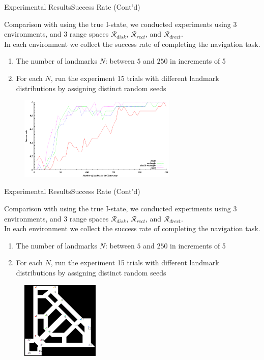 \documentclass[10pt]{beamer}
\begin{document}
\begin{frame}{Experimental Results}{Success Rate (Cont'd)}
 \small{Comparison with using the true I-state, we conducted experiments using 3
 environments, and 3 range spaces $\mathcal{R}_{disk}$, $\mathcal{R}_{rect}$,
 and  $\mathcal{R}_{drect}$. \\
 In each environment we collect the success rate of completing the navigation
 task. 
 \begin{enumerate}
 \item The number of landmarks $N$: between $5$ and $250$ in increments of 5
 \item For each $N$, run the experiment 15 trials with different landmark
   distributions by assigning distinct random seeds
 \end{enumerate}
}
\begin{figure}
  \centering
  \includegraphics[width=0.67\textwidth]{Data/expnumclutter}
\end{figure}
\end{frame}

\begin{frame}{Experimental Results}{Success Rate (Cont'd)}
 \small{Comparison with using the true I-state, we conducted experiments using 3
 environments, and 3 range spaces $\mathcal{R}_{disk}$, $\mathcal{R}_{rect}$,
 and  $\mathcal{R}_{drect}$. \\
 In each environment we collect the success rate of completing the navigation
 task. 
 \begin{enumerate}
 \item The number of landmarks $N$: between $5$ and $250$ in increments of 5
 \item For each $N$, run the experiment 15 trials with different landmark
   distributions by assigning distinct random seeds
 \end{enumerate}
}
\begin{figure}
  \centering
  \includegraphics[width=0.33\textwidth]{figs/office}
\end{figure}
\end{frame}
\end{document}
